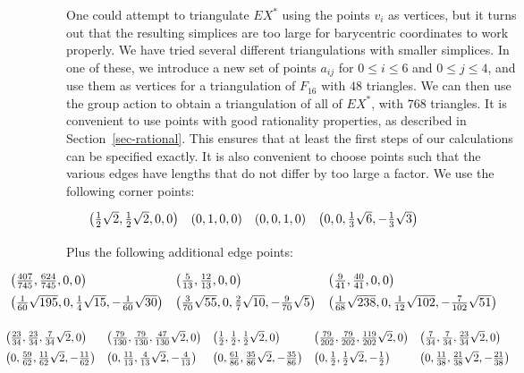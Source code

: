 \documentclass[reqno]{amsart}
\renewcommand{\:}{\colon}
\theoremstyle{definition}
\begin{document}
One could attempt to triangulate $EX^*$ using the points $v_i$ as
vertices, but it turns out that the resulting simplices are too large
for barycentric coordinates to work properly.  We have tried several
different triangulations with smaller simplices.  In one of these, we
introduce a new set of points $a_{ij}$ for $0\leq i\leq 6$ and $0\leq
j\leq 4$, and use them as vertices for a triangulation of $F_{16}$
with $48$ triangles. We can then use the group action to obtain a
triangulation of all of $EX^*$, with $768$ triangles.  It is
convenient to use points with good rationality properties, as
described in Section~\ref{sec-rational}.  This ensures that at least
the first steps of our calculations can be specified exactly.  It is
also convenient to choose points such that the various edges have
lengths that do not differ by too large a factor.  We use the
following corner points:
{\tiny \[ \hspace{-6em}
 \renewcommand{\arraystretch}{1.5} \begin{array}{llll}
  \left(\tfrac{1}{2}\sqrt{2},\tfrac{1}{2}\sqrt{2},0,0\right) &
  \left(0,1,0,0\right) & \left(0,0,1,0\right) &
  \left(0,0,\tfrac{1}{3}\sqrt{6},-\tfrac{1}{3}\sqrt{3}\right)
\end{array} \]}

Plus the following additional edge points:
{\tiny \[ \hspace{-6em} \renewcommand{\arraystretch}{1.5} \begin{array}{lll}
 \left(\tfrac{407}{745},\tfrac{624}{745},0,0\right)  &
 \left(\tfrac{5}{13},\tfrac{12}{13},0,0\right)  &
 \left(\tfrac{9}{41},\tfrac{40}{41},0,0\right)  \\
 \left(\tfrac{1}{60}\sqrt{195},0,\tfrac{1}{4}\sqrt{15},-\tfrac{1}{60}\sqrt{30}\right)  &
 \left(\tfrac{3}{70}\sqrt{55},0,\tfrac{2}{7}\sqrt{10},-\tfrac{9}{70}\sqrt{5}\right)  &
 \left(\tfrac{1}{68}\sqrt{238},0,\tfrac{1}{12}\sqrt{102},-\tfrac{7}{102}\sqrt{51}\right)
\end{array} \]}

{\tiny \[ \hspace{-6em} \renewcommand{\arraystretch}{1.5} \begin{array}{lllll}
 \left(\tfrac{23}{34},\tfrac{23}{34},\tfrac{7}{34}\sqrt{2},0\right)  &
 \left(\tfrac{79}{130},\tfrac{79}{130},\tfrac{47}{130}\sqrt{2},0\right)  &
 \left(\tfrac{1}{2},\tfrac{1}{2},\tfrac{1}{2}\sqrt{2},0\right)  &
 \left(\tfrac{79}{202},\tfrac{79}{202},\tfrac{119}{202}\sqrt{2},0\right)  &
 \left(\tfrac{7}{34},\tfrac{7}{34},\tfrac{23}{34}\sqrt{2},0\right)  \\
 \left(0,\tfrac{59}{62},\tfrac{11}{62}\sqrt{2},-\tfrac{11}{62}\right) &
 \left(0,\tfrac{11}{13},\tfrac{4}{13}\sqrt{2},-\tfrac{4}{13}\right)  &
 \left(0,\tfrac{61}{86},\tfrac{35}{86}\sqrt{2},-\tfrac{35}{86}\right) &
 \left(0,\tfrac{1}{2},\tfrac{1}{2}\sqrt{2},-\tfrac{1}{2}\right)  &
 \left(0,\tfrac{11}{38},\tfrac{21}{38}\sqrt{2},-\tfrac{21}{38}\right)
\end{array} \]}
\medskip
\end{document}
